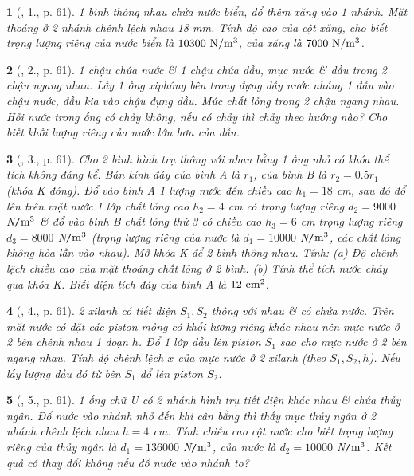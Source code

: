 \documentclass{article}
\newtheorem{baitoan}{}
\begin{document}
\begin{baitoan}[\cite{Van_Quyen_Hanh_Nhu_10_chuyen_Ly}, 1., p. 61]
	1 bình thông nhau chứa nước biển, đổ thêm xăng vào 1 nhánh. Mặt thoáng ở 2 nhánh chênh lệch nhau {\rm18 mm}. Tính độ cao của cột xăng, cho biết trọng lượng riêng của nước biển là $\rm10300\ N{\tt/}m^3$, của xăng là $\rm7000\ N{\tt/}m^3$.
\end{baitoan}

\begin{baitoan}[\cite{Van_Quyen_Hanh_Nhu_10_chuyen_Ly}, 2., p. 61]
	1 chậu chứa nước \& 1 chậu chứa dầu, mực nước \& dầu trong 2 chậu ngang nhau. Lấy 1 ống xiphông bên trong đựng dầy nước nhúng 1 đầu vào chậu nước, đầu kia vào chậu đựng dầu. Mức chất lỏng trong 2 chậu ngang nhau. Hỏi nước trong ống có chảy không, nếu có chảy thì chảy theo hướng nào? Cho biết khối lượng riêng của nước lớn hơn của dầu.
\end{baitoan}

\begin{baitoan}[\cite{Van_Quyen_Hanh_Nhu_10_chuyen_Ly}, 3., p. 61]
	Cho 2 bình hình trụ thông với nhau bằng 1 ống nhỏ có khóa thể tích không đáng kể. Bán kính đáy của bình A là $r_1$, của bình B là $r_2 = 0.5r_1$ (khóa K đóng). Đổ vào bình A 1 lượng nước đến chiều cao $h_1 = 18$ {\rm cm}, sau đó đổ lên trên mặt nước 1 lớp chất lỏng cao $h_2 = 4$ {\rm cm} có trọng lượng riêng $d_2 = 9000$ {\rm N{\tt/}$\rm m^3$} \& đổ vào bình B chất lỏng thứ 3 có chiều cao $h_3 = 6$ {\rm cm} trọng lượng riêng $d_3 = 8000$ {\rm N{\tt/}$\rm m^3$} (trọng lượng riêng của nước là $d_1 = 10000$ {\rm N{\tt/}$\rm m^3$}, các chất lỏng không hòa lẫn vào nhau). Mở khóa K để 2 bình thông nhau. Tính: (a) Độ chênh lệch chiều cao của mặt thoáng chất lỏng ở 2 bình. (b) Tính thể tích nước chảy qua khóa K. Biết diện tích đáy của bình A là $\rm12\ cm^2$.
\end{baitoan}

\begin{baitoan}[\cite{Van_Quyen_Hanh_Nhu_10_chuyen_Ly}, 4., p. 61]
	2 xilanh có tiết diện $S_1,S_2$ thông với nhau \& có chứa nước. Trên mặt nước có đặt các piston mỏng có khối lượng riêng khác nhau nên mực nước ở 2 bên chênh nhau 1 đoạn $h$. Đổ 1 lớp dầu lên piston $S_1$ sao cho mực nước ở 2 bên ngang nhau. Tính độ chênh lệch $x$ của mực nước ở 2 xilanh (theo $S_1,S_2,h$). Nếu lấy lượng dầu đó từ bên $S_1$ đổ lên piston $S_2$.
\end{baitoan}

\begin{baitoan}[\cite{Van_Quyen_Hanh_Nhu_10_chuyen_Ly}, 5., p. 61]
	1 ống chữ U có 2 nhánh hình trụ tiết diện khác nhau \& chứa thủy ngân. Đổ nước vào nhánh nhỏ đến khi cân bằng thì thấy mực thủy ngân ở 2 nhánh chênh lệch nhau $h = 4$ {\rm cm}. Tính chiều cao cột nước cho biết trọng lượng riêng của thủy ngân là $d_1 = 136000$ {\rm N{\tt/}$\rm m^3$}, của nước là $d_2 = 10000$ {\rm N{\tt/}$\rm m^3$}. Kết quả có thay đổi không nếu đổ nước vào nhánh to?
\end{baitoan}
\end{document}
